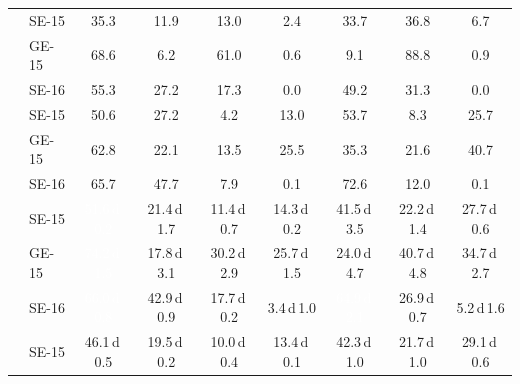 \begin{table}[!htb]
\begin{tabular}{ll cccc @{\hspace{6pt}} ccc}
\addlinespace[2pt]
\multirow{3}{*}{\textbf{Indian}} & SE-15 & 35.3 & 11.9 & 13.0 & 2.4 & 33.7 & 36.8 & 6.7 \\
 & GE-15 & 68.6 & 6.2 & 61.0 & 0.6 & 9.1 & 88.8 & 0.9 \\
 & SE-16 & 55.3 & 27.2 & 17.3 & 0.0 & 49.2 & 31.3 & 0.0 \\
\addlinespace[2pt]
\multirow{3}{*}{\textbf{Other}} & SE-15 & 50.6 & 27.2 & 4.2 & 13.0 & 53.7 & 8.3 & 25.7 \\
 & GE-15 & 62.8 & 22.1 & 13.5 & 25.5 & 35.3 & 21.6 & 40.7 \\
 & SE-16 & 65.7 & 47.7 & 7.9 & 0.1 & 72.6 & 12.0 & 0.1 \\
\addlinespace[2pt]
\midrule
\multirow{3}{*}{\textbf{18--29}} & SE-15 & \cellcolor[HTML]{65AAD4}\textcolor{white}{51.6\,{\tiny\textsf{d}\,}0.2} & \cellcolor[HTML]{CDE0F1}21.4\,{\tiny\textsf{d}\,}1.7 & \cellcolor[HTML]{E0ECF8}11.4\,{\tiny\textsf{d}\,}0.7 & \cellcolor[HTML]{DBE9F6}14.3\,{\tiny\textsf{d}\,}0.2 & \cellcolor[HTML]{8DC1DD}41.5\,{\tiny\textsf{d}\,}3.5 & \cellcolor[HTML]{CCDFF1}22.2\,{\tiny\textsf{d}\,}1.4 & \cellcolor[HTML]{BED8EC}27.7\,{\tiny\textsf{d}\,}0.6 \\
 & GE-15 & \cellcolor[HTML]{2373B6}\textcolor{white}{74.2\,{\tiny\textsf{d}\,}1.5} & \cellcolor[HTML]{D4E4F4}17.8\,{\tiny\textsf{d}\,}3.1 & \cellcolor[HTML]{B5D4E9}30.2\,{\tiny\textsf{d}\,}2.9 & \cellcolor[HTML]{C4DAEE}25.7\,{\tiny\textsf{d}\,}1.5 & \cellcolor[HTML]{C8DCF0}24.0\,{\tiny\textsf{d}\,}4.7 & \cellcolor[HTML]{91C3DE}40.7\,{\tiny\textsf{d}\,}4.8 & \cellcolor[HTML]{A8CEE4}34.7\,{\tiny\textsf{d}\,}2.7 \\
 & SE-16 & \cellcolor[HTML]{3888C1}\textcolor{white}{66.0\,{\tiny\textsf{d}\,}0.8} & \cellcolor[HTML]{89BEDC}42.9\,{\tiny\textsf{d}\,}0.9 & \cellcolor[HTML]{D4E4F4}17.7\,{\tiny\textsf{d}\,}0.2 & \cellcolor[HTML]{F1F7FD}3.4\,{\tiny\textsf{d}\,}1.0 & \cellcolor[HTML]{3B8BC2}\textcolor{white}{64.9\,{\tiny\textsf{d}\,}2.1} & \cellcolor[HTML]{C1D9ED}26.9\,{\tiny\textsf{d}\,}0.7 & \cellcolor[HTML]{EDF4FC}5.2\,{\tiny\textsf{d}\,}1.6 \\
\addlinespace[2pt]
\multirow{3}{*}{\textbf{30--39}} & SE-15 & \cellcolor[HTML]{7AB6D9}46.1\,{\tiny\textsf{d}\,}0.5 & \cellcolor[HTML]{D1E2F3}19.5\,{\tiny\textsf{d}\,}0.2 & \cellcolor[HTML]{E3EEF9}10.0\,{\tiny\textsf{d}\,}0.4 & \cellcolor[HTML]{DCEAF6}13.4\,{\tiny\textsf{d}\,}0.1 & \cellcolor[HTML]{8ABFDD}42.3\,{\tiny\textsf{d}\,}1.0 & \cellcolor[HTML]{CDDFF1}21.7\,{\tiny\textsf{d}\,}1.0 & \cellcolor[HTML]{B9D6EA}29.1\,{\tiny\textsf{d}\,}0.6 \\

\end{tabular}
\end{table}
